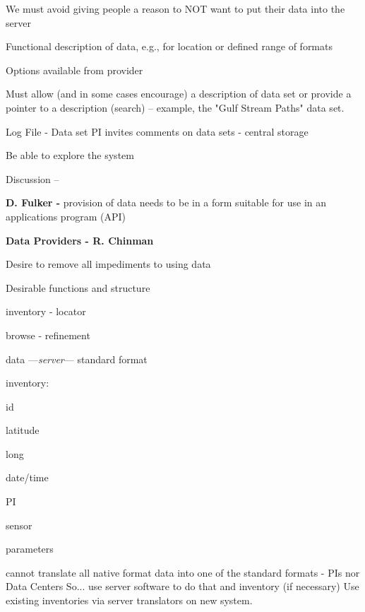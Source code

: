 \begin{description}
\begin{description}
	\item{} We must avoid giving people a reason to NOT want to put their
data into the server
\end{description}

\begin{description}
	\item{} Functional description of data, e.g.,  for location or
defined range of formats
	\item{} Options available from provider
	\item{} Must allow (and in some cases encourage) a description of
data set or provide a pointer to a description (search) -- example, the "Gulf
Stream Paths" data set.
	\item{} Log File - Data set PI invites comments on data sets - central
storage 
	\item{} Be able to explore the system
\end{description}


\noindent Discussion --


{\bf D. Fulker -} provision of data needs to be in a form suitable for use in
an applications program  (API)


{\bf Data Providers  - R. Chinman}
\begin{description}
	\item {}Desire to remove all impediments to using data

	\item{}Desirable functions and structure
\begin{description}
	\item{} inventory - locator
   	\item{} browse - refinement
	\item{} data ---{\em server}--- standard format
\end{description}
\noindent inventory:
	\begin{description}
		\item{} id
		\item{} latitude
		\item{} long
		\item{} date/time
		\item{} PI
		\item{} sensor
		\item{} parameters
	\end{description}
\end{description}
cannot translate all native format data into one of the standard formats - 
PIs nor Data Centers
So... use server software to do that and inventory (if necessary) 
Use existing inventories via server translators on new system.


\end{description}
